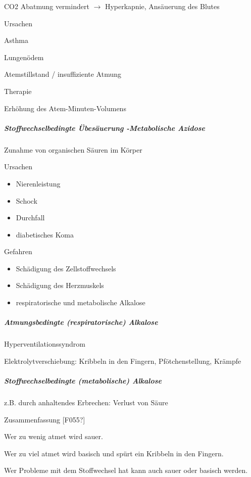 \documentclass{article}
\begin{document}
CO2  Abatmung vermindert ${\rightarrow}$ Hyperkapnie,  Ans\"auerung des
Blutes

Ursachen

Asthma

Lungen\"odem

Atemstillstand / insuffiziente Atmung

Therapie

Erh\"ohung des Atem-Minuten-Volumens

\subparagraph[Stoffwechselbedingte \"Ubes\"auerung -Metabolische
Azidose]{Stoffwechselbedingte \"Ubes\"auerung -Metabolische Azidose}
Zunahme von
organischen S\"auren im  K\"orper

Ursachen

\begin{itemize}
\item Nierenleistung 

\item Schock

\item Durchfall

\item diabetisches Koma

\end{itemize}
Gefahren

\begin{itemize}
\item Sch\"adigung des Zellstoffwechsels

\item Sch\"adigung des Herzmuskels

\item respiratorische und metabolische  Alkalose

\end{itemize}
\subparagraph[Atmungsbedingte (respiratorische)
Alkalose]{Atmungsbedingte (respiratorische) Alkalose}
Hyperventilationssyndrom

Elektrolytverschiebung: Kribbeln in den Fingern, Pf\"otchenstellung,
Kr\"ampfe

\subparagraph{Stoffwechselbedingte (metabolische) Alkalose}
z.B. durch anhaltendes Erbrechen: Verlust von S\"aure

Zusammenfassung [F055?]

Wer zu wenig atmet wird sauer.

Wer zu viel atmet wird basisch und sp\"urt ein Kribbeln in den Fingern. 

Wer Probleme mit dem Stoffwechsel hat kann auch sauer oder basisch
werden.
\end{document}
